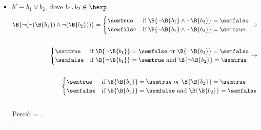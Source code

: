 {\begin{enumerate}[label=(\alph*)]
\begin{itemize}
    \item $ b' \equiv b_1 \lor b_2$, dove $b_1, b_2 \in \bexp$. \\
      \begin{align*}
        \B{\lnot (\lnot (\B{b_1}) \land \lnot (\B{b_2}))} =
        \begin{cases}
        \semtrue &
        \mbox{if} \ \B{\lnot \B{b_1} \land \lnot \B{b_2}} = \semfalse \\
        \semfalse &
        \mbox{if} \ \B{\lnot \B{b_1} \land \lnot \B{b_2}} = \semtrue \\
        \end{cases}
        \rightarrow \\ \\
        \begin{cases}
        \semtrue &
        \mbox{if} \ \B {\lnot \B{b_1}} = \semfalse
                    \mbox{ or }
                    \B {\lnot \B{b_2}} = \semfalse \\
        \semfalse &
        \mbox{if} \ \B{\lnot \B{b_1}} = \semtrue
                    \mbox{ and }
                    \B{\lnot \B{b_2}} = \semtrue \\
        \end{cases}
        \rightarrow \\ \\
        \begin{cases}
        \semtrue &
        \mbox{if} \ \B {\B{b_1}} = \semtrue
                    \mbox{ or }
                    \B {\B{b_2}} = \semtrue \\
        \semfalse &
        \mbox{if} \ \B{\B{b_1}} = \semfalse
                    \mbox{ and }
                    \B{\B{b_2}} = \semfalse \\
        \end{cases}
      \end{align*} \\
      Perciò  =
      . \\.


\end{itemize}
\end{enumerate}}
